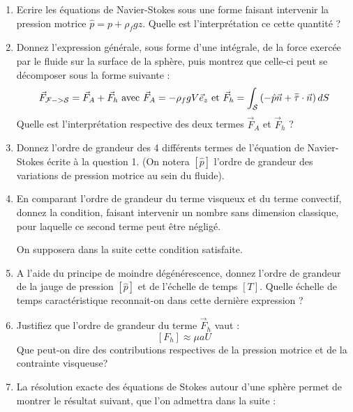 \begin{enumerate}

\item Ecrire les équations de Navier-Stokes sous une forme faisant
intervenir la pression motrice $\hat{p} = p + \rho_f g z$. Quelle est l'interprétation ce cette quantité ?

\item Donnez l'expression générale, sous forme d'une intégrale, de la force exercée par le fluide sur la surface de la sphère, puis montrez que celle-ci peut se décomposer sous la forme suivante :
$$
\vec F_{{\cal F} -> {\cal S}} = \vec F_A + \vec F_h  \mbox{ avec } 
\vec F_A = - \rho_f g V \vec e_z  
\mbox{ et } 
\vec F_h
= \int_{\cal S} \left( -\hat{p} \vec n + \accentset{=}{\tau } \cdot \vec n \right) dS
$$
Quelle est l'interprétation respective des deux termes $\vec F_A$ et $ \vec F_h$ ?


\item
Donnez l'ordre de grandeur des 4 différents termes de l'équation de Navier-Stokes écrite à la question 1. 
(On notera $[\hat p]$ l'ordre de grandeur des variations de pression motrice au sein du fluide).


\item En comparant l'ordre de grandeur du terme visqueux et du terme convectif, donnez la condition, faisant intervenir un nombre sans dimension classique, pour laquelle ce second 
terme peut être négligé.

On supposera dans la suite cette condition satisfaite.

\item A l'aide du principe de moindre dégénérescence, donnez l'ordre de grandeur de la jauge de pression $[\hat p]$ et de l'échelle de temps $[T]$. Quelle échelle de temps caractéristique reconnait-on dans cette dernière expression ?

\item Justifiez que l'ordre de grandeur du terme $\vec F_h$ vaut :
$$
[F_h]  \approx \mu a  U
$$
Que peut-on dire des contributions respectives de la pression motrice et de la contrainte visqueuse?



\item  
La résolution exacte des équations de Stokes autour d'une sphère permet de montrer le résultat suivant, que l'on admettra dans la suite :


\end{enumerate}
